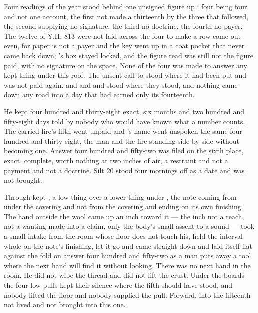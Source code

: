 Four readings of the year stood behind one unsigned figure up : four being four and not one account, the first not made a thirteenth by the three that followed, the second supplying no signature, the third no doctrine, the fourth no payer. The twelve of Y.H. 813 were not laid across the four to make a row come out even, for paper is not a payer and the key went up in a coat pocket that never came back down; 's box stayed locked, and the figure read was still not the figure paid, with no signature on the space. None of the four was made to answer any kept thing under this roof. The unsent call to  stood where it had been put and was not paid again.  and  and  and  stood where they stood, and nothing came down any road into a day that had earned only its fourteenth.

He kept four hundred and thirty-eight exact, six months and two hundred and fifty-eight days told by nobody who would have known what a number counts. The carried fire's fifth went unpaid and 's name went unspoken the same four hundred and thirty-eight, the man and the fire standing side by side without becoming one. Answer four hundred and fifty-two was filed on the sixth place, exact, complete, worth nothing at two inches of air, a restraint and not a payment and not a doctrine. Silt 20 stood four mornings off as a date and was not brought.

Through   kept , a low thing over a lower thing under , the note coming from under the covering and not from the covering and ending on its own finishing. The hand outside the wool came up an inch toward it --- the inch not a reach, not a wanting made into a claim, only the body's small assent to a sound --- took a small intake from the room whose floor does not touch his, held the interval whole on the note's finishing, let it go and came straight down and laid itself flat against the fold on answer four hundred and fifty-two as a man puts away a tool where the next hand will find it without looking. There was no next hand in the room. He did not wipe the thread and did not lift the crust. Under the boards the four low pulls kept their silence where the fifth should have stood, and nobody lifted the floor and nobody supplied the pull. Forward, into the fifteenth not lived and not brought into this one.

